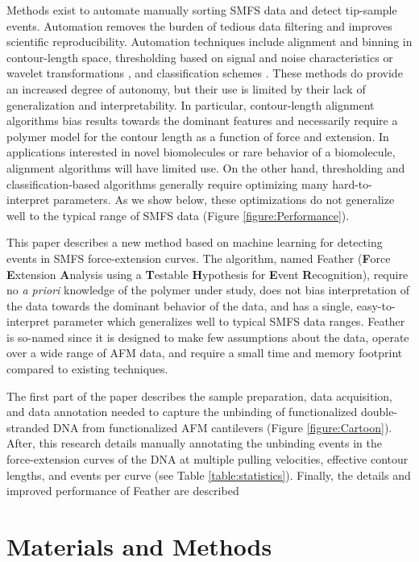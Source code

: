 \documentclass[%
  aip,12pt,tightenlines,
  amsthm,
 amsmath,amssymb
]{article}
\newcommand{\tRef}[1]{Table \ref{table:#1}}
\newcommand{\fRef}[1]{Figure \ref{figure:#1}}
\newcommand{\sLabel}[1]{\label{section:#1}}
\newcommand{\pl}[0]{\vspace{6pt}}
\newcommand{\name}[0]{Feather}
\newcommand{\acronym}[0]{\textbf{F}orce \textbf{E}xtension \textbf{A}nalysis using a \textbf{T}estable \textbf{H}ypothesis for \textbf{E}vent \textbf{R}ecognition}
\newcommand{\singlemol}[0]{SMFS}
\begin{document}
Methods exist to automate manually sorting \singlemol{} data and detect tip-sample events. Automation removes the burden of tedious data filtering and improves scientific reproducibility. Automation techniques include alignment and binning in contour-length space\cite{kuhn_automated_2005,bosshart_reference-free_2012}, thresholding based on signal and noise characteristics \cite{gergely_semi-automatized_2001,roduit_openfovea:_2012} or wavelet transformations \cite{garcia-masso_automated_2016,benitez_searching_2017}, and classification schemes \cite{kasas_fuzzy_2000}. These methods do provide an increased degree of autonomy, but their use is limited by their lack of generalization and interpretability. In particular, contour-length alignment algorithms bias results towards the dominant features and necessarily require a polymer model for the contour length as a function of force and extension. In applications interested in novel biomolecules or rare behavior of a biomolecule, alignment algorithms will have limited use.  On the other hand, thresholding and classification-based algorithms generally require optimizing many hard-to-interpret parameters. As we show below, these optimizations do not generalize well to the typical range of \singlemol{} data (\fRef{Performance}).\pl

This paper describes a new method based on machine learning for detecting events in \singlemol{} force-extension curves.  The algorithm, named \name{} (\acronym{}), require no \emph{a priori} knowledge of the polymer under study, does not bias interpretation of the data towards the dominant behavior of the data, and has a single, easy-to-interpret parameter which generalizes well to typical \singlemol{} data ranges. \name{} is so-named since it is designed to make few assumptions about the data, operate over a wide range of AFM data, and require a small time and memory footprint compared to existing techniques.\pl

 The first part of the paper describes the sample preparation, data acquisition, and data annotation needed to capture the unbinding of functionalized double-stranded DNA from functionalized AFM cantilevers (\fRef{Cartoon}). After, this research details manually annotating the unbinding events in the force-extension curves of the DNA at multiple pulling velocities, effective contour lengths, and events per curve (see \tRef{statistics}). Finally, the details and improved performance of \name{} are described \pl

\section{\sLabel{Materials}Materials and Methods}
\end{document}
